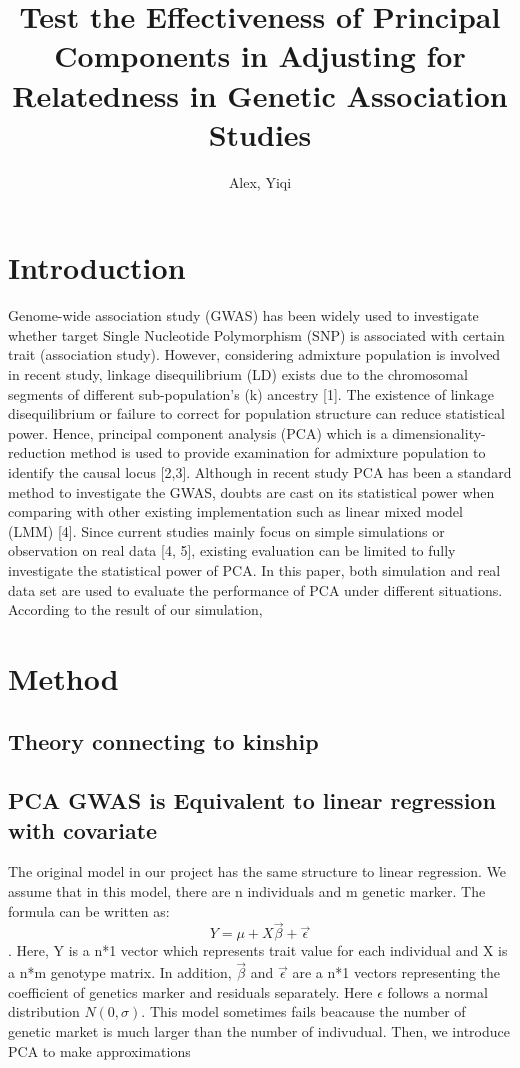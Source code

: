 \documentclass[12pt]{article}
\title{Test the Effectiveness of Principal Components in Adjusting for Relatedness in Genetic Association Studies}
\author{Alex, Yiqi }
\begin{document}
	\maketitle
	
	
\section{Introduction} 

Genome-wide association study (GWAS) has been widely used to investigate whether target Single Nucleotide Polymorphism (SNP) is associated with certain trait (association study). However, considering admixture population is involved in recent study, linkage disequilibrium (LD) exists due to the chromosomal segments of different sub-population's (k) ancestry [1]. The existence of linkage disequilibrium or failure to correct for population structure can reduce statistical power. Hence, principal component analysis (PCA) which is a dimensionality-reduction method is used to provide examination for admixture population to identify the causal locus [2,3]. Although in recent study PCA has been a standard method to investigate the GWAS, doubts are cast on its statistical power when comparing with other existing implementation such as linear mixed model (LMM) [4]. Since current studies mainly focus on simple simulations or observation on real data [4, 5], existing evaluation can be limited to fully investigate the statistical power of PCA. In this paper, both simulation and real data set are used to evaluate the performance of PCA under different situations.\\

According to the result of our simulation, 

\section{Method} 
\subsection{Theory connecting to kinship}

\subsection{PCA GWAS  is Equivalent to linear regression with covariate}
The original model in our project has the same structure to linear regression. We assume that in this model, there are n individuals and m genetic marker. The formula can be written as: $$Y=\mu+X \vec{\beta}+\vec{\epsilon}$$. Here, Y is a n*1 vector which represents trait value for each individual and X is a n*m genotype matrix. In addition, $\vec{\beta}$ and $\vec{\epsilon}$ are a n*1 vectors representing the coefficient of genetics marker and residuals separately. Here $\epsilon$ follows a normal distribution $N(0,\sigma)$. This model sometimes fails beacause the number of genetic market is much larger than the number of indivudual. Then, we introduce PCA to make approximations\\
\end{document}
